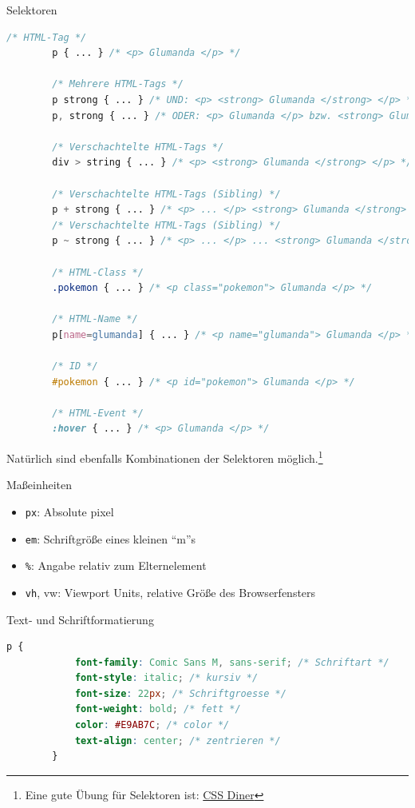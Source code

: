 \begin{example}{Selektoren}
    \begin{lstlisting}[language=CSS]
        /* HTML-Tag */
        p { ... } /* <p> Glumanda </p> */

        /* Mehrere HTML-Tags */
        p strong { ... } /* UND: <p> <strong> Glumanda </strong> </p> */
        p, strong { ... } /* ODER: <p> Glumanda </p> bzw. <strong> Glumanda </strong> */

        /* Verschachtelte HTML-Tags */
        div > string { ... } /* <p> <strong> Glumanda </strong> </p> */

        /* Verschachtelte HTML-Tags (Sibling) */
        p + strong { ... } /* <p> ... </p> <strong> Glumanda </strong> */
        /* Verschachtelte HTML-Tags (Sibling) */
        p ~ strong { ... } /* <p> ... </p> ... <strong> Glumanda </strong> */
        
        /* HTML-Class */
        .pokemon { ... } /* <p class="pokemon"> Glumanda </p> */

        /* HTML-Name */
        p[name=glumanda] { ... } /* <p name="glumanda"> Glumanda </p> */

        /* ID */
        #pokemon { ... } /* <p id="pokemon"> Glumanda </p> */

        /* HTML-Event */
        :hover { ... } /* <p> Glumanda </p> */
    \end{lstlisting}

    Natürlich sind ebenfalls Kombinationen der Selektoren möglich.\footnote{Eine gute Übung für Selektoren ist: \href{https://flukeout.github.io/}{CSS Diner}}
\end{example}

\begin{bonus}{Maßeinheiten}
    \begin{itemize}
        \item \texttt{px}: Absolute pixel
        \item \texttt{em}: Schriftgröße eines kleinen \enquote{m}s
        \item \texttt{\%}: Angabe relativ zum Elternelement
        \item \texttt{vh}, vw: Viewport Units, relative Größe des Browserfensters
    \end{itemize}
\end{bonus}

\begin{bonus}{Text- und Schriftformatierung}
    \begin{lstlisting}[language=CSS]
        p {
            font-family: Comic Sans M, sans-serif; /* Schriftart */
            font-style: italic; /* kursiv */
            font-size: 22px; /* Schriftgroesse */
            font-weight: bold; /* fett */
            color: #E9AB7C; /* color */
            text-align: center; /* zentrieren */
        }
    \end{lstlisting}
\end{bonus}

